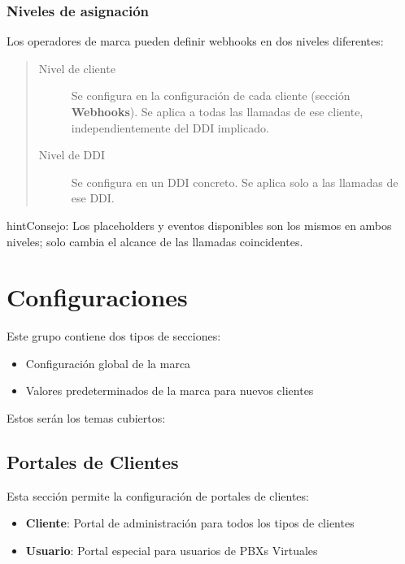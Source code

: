 \documentclass[letterpaper,10pt,spanish]{sphinxmanual}
\begin{document}
\subsubsection{Niveles de asignación}
\label{administration_portal/brand/calls/webhooks:assignment-levels}
Los operadores de marca pueden definir webhooks en dos niveles diferentes:
\begin{quote}
\begin{description}
\item[{Nivel de cliente}] \leavevmode
Se configura en la configuración de cada cliente (sección \textbf{Webhooks}). Se aplica a todas las llamadas de ese cliente, independientemente del DDI implicado.

\item[{Nivel de DDI}] \leavevmode
Se configura en un DDI concreto. Se aplica solo a las llamadas de ese DDI.

\end{description}
\end{quote}

\begin{notice}{hint}{Consejo:}
Los placeholders y eventos disponibles son los mismos en ambos niveles; solo cambia el alcance de las llamadas coincidentes.
\end{notice}


\section{Configuraciones}
\label{administration_portal/brand/settings/index::doc}\label{administration_portal/brand/settings/index:settings}
Este grupo contiene dos tipos de secciones:
\begin{itemize}
\item {} 
Configuración global de la marca

\item {} 
Valores predeterminados de la marca para nuevos clientes

\end{itemize}

Estos serán los temas cubiertos:
\label{administration_portal/brand/settings/client_portals:client-portals}

\subsection{Portales de Clientes}
\label{administration_portal/brand/settings/client_portals:client-portals}\label{administration_portal/brand/settings/client_portals:id2}\label{administration_portal/brand/settings/client_portals::doc}\label{administration_portal/brand/settings/client_portals:id1}
Esta sección permite la configuración de portales de clientes:
\begin{itemize}
\item {} 
\textbf{Cliente}: Portal de administración para todos los tipos de clientes

\item {} 
\textbf{Usuario}: Portal especial para usuarios de PBXs Virtuales

\end{itemize}
\end{document}
